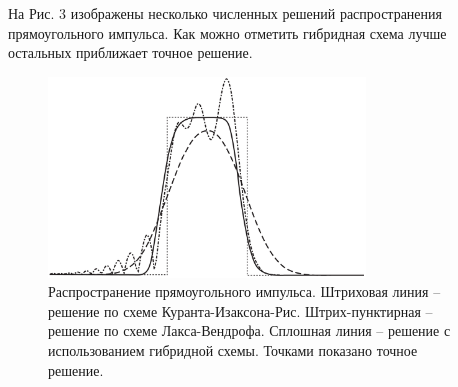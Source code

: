 	На Рис. 3 изображены несколько численных решений распространения прямоугольного импульса. Как можно отметить гибридная схема лучше остальных приближает точное решение.
\begin{figure}[H]
\centerline{\includegraphics[width=0.75\textwidth]{png/hybrid-scheme-testing.png}}
\caption{Распространение прямоугольного импульса. Штриховая линия -- решение по схеме Куранта-Изаксона-Рис. Штрих-пунктирная -- решение по схеме Лакса-Вендрофа. Сплошная линия -- решение с использованием гибридной схемы. Точками показано точное решение.}
\label{pic:hybrid-scheme-testing}
\end{figure}
